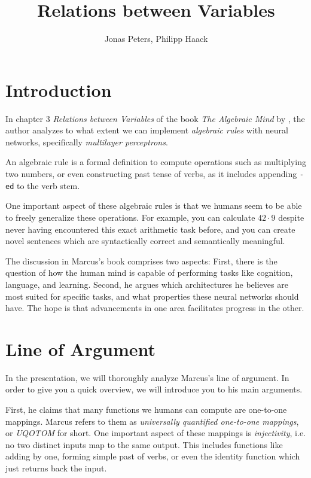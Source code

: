 \documentclass{article}
\title{Relations between Variables}
\author{Jonas Peters, Philipp Haack}
\theoremstyle{plain}
\theoremstyle{definition}
\begin{document}
\maketitle

\section*{Introduction}
In chapter 3 \emph{Relations between Variables} of the book \emph{The Algebraic Mind} by \textcite{marcus2001algebraic}, the author analyzes to what extent we can implement \emph{algebraic rules} with neural networks, specifically \emph{multilayer perceptrons}.

An algebraic rule is a formal definition to compute operations such as multiplying two numbers, or even constructing past tense of verbs, as it includes appending \texttt{-ed} to the verb stem.

One important aspect of these algebraic rules is that we humans seem to be able to freely generalize these operations. For example, you can calculate $42 \cdot 9$ despite never having encountered this exact arithmetic task before, and you can create novel sentences which are syntactically correct and semantically meaningful.

The discussion in Marcus's book comprises two aspects: First, there is the question of how the human mind is capable of performing tasks like cognition, language, and learning. Second, he argues which architectures he believes are most suited for specific tasks, and what properties these neural networks should have. The hope is that advancements in one area facilitates progress in the other.


\section*{Line of Argument}
In the presentation, we will thoroughly analyze Marcus's line of argument. In order to give you a quick overview, we will introduce you to his main arguments.

First, he claims that many functions we humans can compute are one-to-one mappings. Marcus refers to them as \emph{universally quantified one-to-one mappings}, or \emph{UQOTOM} for short. One important aspect of these mappings is \emph{injectivity}, i.e. no two distinct inputs map to the same output. This includes functions like adding by one, forming simple past of verbs, or even the identity function which just returns back the input.
\end{document}
